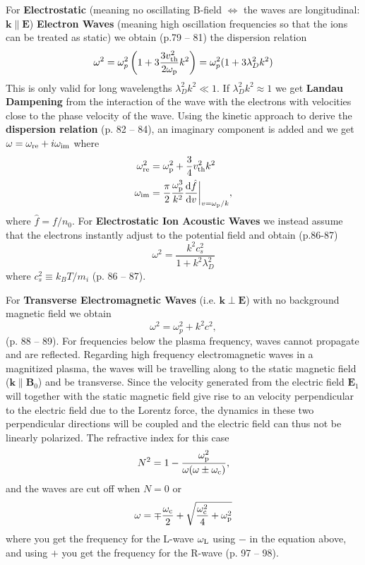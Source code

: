 \documentclass[10pt,landscape]{article}
\renewcommand{\vec}{\bm}
\newcommand{\topiccolor}{green}
\newcommand{\cbf}[1]{\textcolor{\topiccolor!80!black}{\textbf{#1}}}
\begin{document}
\begin{multicols*}{3}
For \cbf{Electrostatic} (meaning no oscillating B-field $\iff$ the waves
are longitudinal: $\vec k \parallel \vec E$)
\cbf{Electron Waves} (meaning high oscillation frequencies so that the ions
can be treated as static) we obtain (p.79 -- 81) the dispersion relation
\begin{equation*}
	\omega^2 = \omega_p^2 \left(1 + 3 \frac{3v_{\rm th}^2}{2 \omega_{\rm p}} k^2\right) = \omega_p^2 (1 + 3 \lambda_D^2 k^2)
\end{equation*}
This is only valid for long wavelengths $\lambda_D^2 k^2 \ll 1$.
If $\lambda_D^2 k^2 \approx 1$ we get \cbf{Landau Dampening}
from the interaction of the wave with the electrons with velocities close to the
phase velocity of the wave.
Using the kinetic approach to derive the \cbf{dispersion relation} (p. 82 -- 84), an imaginary
component is added and we get $\omega=\omega_{\rm re} + i\omega_{\rm im}$ where
\begin{align*}
	\omega_{\rm re}^2 &= \omega_{\rm p}^2 + \frac34 v_{\rm th}^2k^2 \\
	\omega_{\rm im} &= \frac\pi2 \frac{\omega_{\rm p}^3}{k^2}\diff{\hat{f}}{v}\biggr\rvert_{v=\omega_{\rm p}/k},
\end{align*}
where $\hat{f}=f/n_0$.
For \cbf{Electrostatic Ion Acoustic Waves} we instead assume that the electrons
instantly adjust to the potential field and obtain (p.86-87)
\[
	\omega^2 = \frac{k^2 c_s^2}{1+k^2 \lambda_D^2}
\]
where $c_s^2 \equiv k_BT/m_i$ (p. 86 -- 87).

For \cbf{Transverse Electromagnetic Waves} (i.e. $\vec k \perp \vec E$)
with no background magnetic field we obtain 
\begin{equation*}
	\omega^2 = \omega_p^2 +  k^2 c^2,
\end{equation*}
(p. 88 -- 89).
For frequencies below the plasma frequency, waves cannot propagate and are
reflected.
Regarding high frequency electromagnetic waves in a magnitized plasma, the waves will be travelling along to the static magnetic field ($\vec k \parallel \vec B_0$) and be transverse. 
Since the velocity generated from the electric field $\vec E_1$ will together with the static magnetic field give rise to an velocity perpendicular to the electric field due to the Lorentz force, the dynamics in these two perpendicular directions will be coupled and the electric field can thus not be linearly polarized.
The refractive index for this case 
\begin{equation*}
	N^2 = 1 - \frac{\omega_{\rm p}^2}{\omega(\omega \pm \omega_{\rm c})},
\end{equation*}
and the waves are cut off when $N=0$ or 
\begin{equation}
	\omega = \mp \frac{\omega_{\rm c}}{2}+\sqrt{\frac{\omega_{\rm c}^2}{4}+\omega_{\rm p}^2}
\end{equation}
where you get the frequency for the L-wave $\omega_{\rm L}$ using $-$ in the equation above, and using $+$ you get the frequency for the R-wave (p. 97 -- 98).


\end{multicols*}
\end{document}
